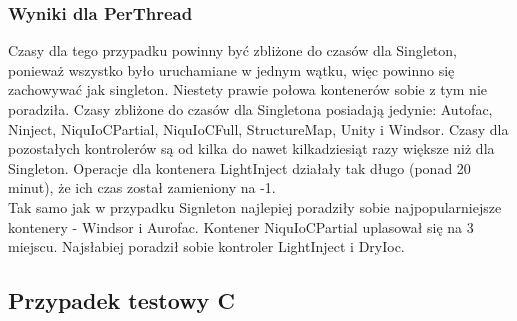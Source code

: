 \documentclass[12pt]{article}
\begin{document}
\subsubsection{Wyniki dla PerThread}
Czasy dla tego przypadku powinny być zbliżone do czasów dla Singleton, ponieważ wszystko było uruchamiane w jednym wątku, więc powinno się zachowywać jak singleton. Niestety prawie połowa kontenerów sobie z tym nie poradziła. Czasy zbliżone do czasów dla Singletona posiadają jedynie: Autofac, Ninject, NiquIoCPartial, NiquIoCFull, StructureMap, Unity i Windsor. Czasy dla pozostałych kontrolerów są od kilka do nawet kilkadziesiąt razy większe niż dla Singleton. Operacje dla kontenera LightInject działały tak długo (ponad 20 minut), że ich czas został zamieniony na -1.\\
Tak samo jak w przypadku Signleton najlepiej poradziły sobie najpopularniejsze kontenery - Windsor i Aurofac. Kontener NiquIoCPartial uplasował się na 3 miejscu. Najsłabiej poradził sobie kontroler LightInject i DryIoc.


\subsection{Przypadek testowy C}
\end{document}
